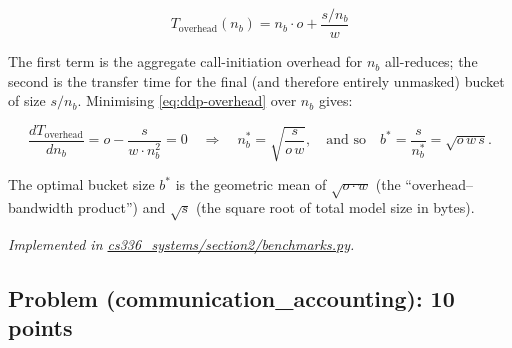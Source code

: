 \documentclass[letterpaper]{article}
\newcommand{\repofile}[2]{\href{https://github.com/echung32/ece405-assignment4-hpc/blob/main/#1}{#2}}
\begin{document}
\begin{itemize}
		\begin{equation}
			T_{\text{overhead}}(n_b) = n_b \cdot o + \frac{s / n_b}{w}
			\label{eq:ddp-overhead}
		\end{equation}
		
		The first term is the aggregate call-initiation overhead for $n_b$ all-reduces; the second is the transfer time for the final (and therefore entirely unmasked) bucket of size $s/n_b$.
		Minimising \eqref{eq:ddp-overhead} over $n_b$ gives:
		
		\begin{equation}
			\frac{dT_{\text{overhead}}}{dn_b} = o - \frac{s}{w \cdot n_b^{2}} = 0
			\quad\Longrightarrow\quad
			n_b^{*} = \sqrt{\frac{s}{o\,w}},
			\quad\text{and so}\quad
			b^{*} = \frac{s}{n_b^{*}} = \sqrt{o\,w\,s}.
			\label{eq:optimal-bucket}
		\end{equation}
		
		The optimal bucket size $b^{*}$ is the geometric mean of $\sqrt{o \cdot w}$ (the ``overhead--bandwidth product'') and $\sqrt{s}$ (the square root of total model size in bytes).
	\end{itemize}
	
	\textit{Implemented in \repofile{cs336_systems/section2/benchmarks.py}{cs336\_systems/section2/benchmarks.py}.}
	
	\subsection{Problem (communication\_accounting): 10 points}
	
\end{document}
